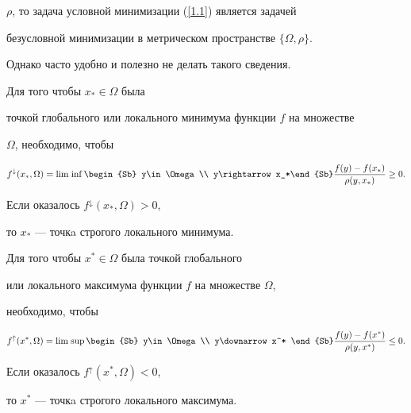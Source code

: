 $\rho$, то задача условной минимизации (\ref{1.1}) является задачей


безусловной минимизации в метрическом пространстве $\{\Omega,\rho\}$.


Однако часто удобно и полезно не делать такого сведения.








\begin{thms}\label{t1.3}


Для того чтобы $x_{*}\in \Omega$ была


точкой глобального или локального минимума функции $f$ на множестве


$\Omega$, необходимо, чтобы


\begin{equation}\label{1.2}


f^{\downarrow}(x_{*},\Omega) =


\Liminf\limits \begin{Sb} y\in\Omega\\ y\rightarrow x_*\end{Sb}


\frac{f(y) - f(x_{*})}{\rho(y,x_{*})}\geq 0.


\end{equation}


Если оказалось $f^{\downarrow}(x_{*},\Omega) > 0$,


то $x_{*}$ --- точкa строгого локального минимума.


\end{thms}





\begin{thms}\label{t1.4}


Для того чтобы $x^{*}\in \Omega$ была точкой глобального 


или локального максимума функции $f$ на множестве $\Omega$,


необходимо, чтобы


\begin{equation}\label{1.3}


f^{\uparrow}(x^{*},\Omega) = \Limsup\limits \begin{Sb} y\in \Omega\\


y\downarrow x^* \end{Sb} \frac{f(y) -


f(x^{*})}{\rho(y,x^{*})}\leq 0.


\end{equation}


Если оказалось $f^{\uparrow}(x^{*},\Omega)< 0$,


то $x^{*}$ --- точкa строгого локального максимума.


\end{thms}





